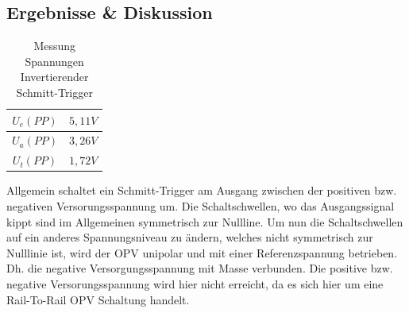 \documentclass[12pt,a4paper,titlepage]{article}
\begin{document}
\subsection*{Ergebnisse \& Diskussion}
\begin{table}[H]
  \centering
  \begin{tabular}{c|c}
    $U_e (PP)$ & $5,11V$ \\
    \hline
    $U_a (PP)$ & $3,26V$ \\
    \hline
    $U_t (PP)$ & $1,72V$
  \end{tabular}
  \caption{Messung Spannungen Invertierender Schmitt-Trigger}
  \label{figure42}
\end{table}
Allgemein schaltet ein Schmitt-Trigger am Ausgang zwischen der positiven bzw. negativen Versorungsspannung um. Die Schaltschwellen, wo das Ausgangssignal kippt sind im Allgemeinen symmetrisch zur Nullline. Um nun die Schaltschwellen auf ein anderes Spannungsniveau zu \"andern, welches nicht symmetrisch zur Nulllinie ist, wird der OPV unipolar und mit einer Referenzspannung betrieben. Dh. die negative Versorgungsspannung mit Masse verbunden. Die positive bzw. negative Versorungsspannung wird hier nicht erreicht, da es sich hier um eine Rail-To-Rail OPV Schaltung handelt.
\end{document}
